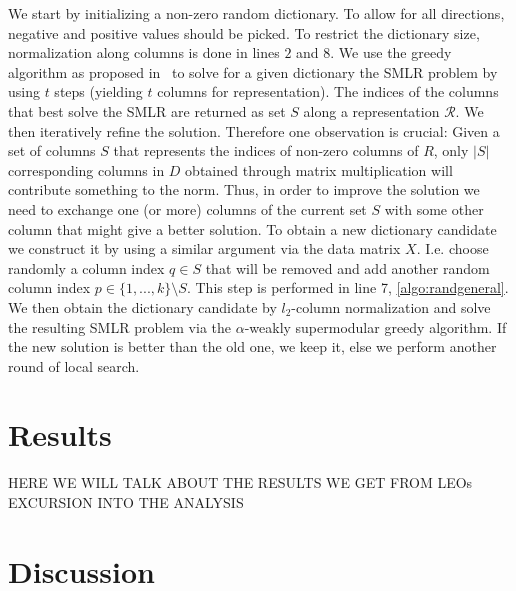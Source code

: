 \documentclass{article}
\newcommand{\Rr}{\mathcal{R}}
\begin{document}
\noindent We start by initializing a non-zero random dictionary. To allow for all directions, negative and positive values should be picked. To restrict the dictionary size, normalization along columns is done in lines $2$ and $8$. We use the greedy algorithm as proposed in~\cite{weaklyalpha} to solve for a given dictionary the SMLR problem by using $t$ steps (yielding $t$ columns for representation). The indices of the columns that best solve the SMLR are returned as set $S$ along a representation $\Rr$. We then iteratively refine the solution. Therefore one observation is crucial: Given a set of columns $S$ that represents the indices of non-zero columns of $R$, only $|S|$ corresponding columns in $D$ obtained through matrix multiplication will contribute something to the norm. Thus, in order to improve the solution we need to exchange one (or more) columns of the current set $S$ with some other column that might give a better solution. To obtain a new dictionary candidate we construct it by using a similar argument via the data matrix $X$. I.e. choose randomly a column index $q \in S$ that will be removed and add another random column index $p \in \lbrace 1, ..., k \rbrace \setminus S$. This step is performed in line 7, \ref{algo:randgeneral}. We then obtain the dictionary candidate by $l_2$-column normalization and solve the resulting SMLR problem via the $\alpha$-weakly supermodular greedy algorithm. If the new solution is better than the old one, we keep it, else we perform another round of local search.

\section{Results}\label{sec:results}

HERE WE WILL TALK ABOUT THE RESULTS WE GET FROM LEOs EXCURSION INTO THE ANALYSIS


\section{Discussion}\label{sec:discuss}
\end{document}
